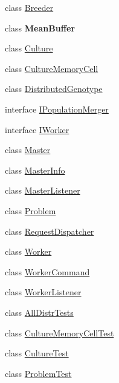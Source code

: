\begin{DoxyCompactItemize}
\item 
class \hyperlink{classorg_1_1jgap_1_1distr_1_1_breeder}{Breeder}
\item 
class {\bfseries Mean\-Buffer}
\item 
class \hyperlink{classorg_1_1jgap_1_1distr_1_1_culture}{Culture}
\item 
class \hyperlink{classorg_1_1jgap_1_1distr_1_1_culture_memory_cell}{Culture\-Memory\-Cell}
\item 
class \hyperlink{classorg_1_1jgap_1_1distr_1_1_distributed_genotype}{Distributed\-Genotype}
\item 
interface \hyperlink{interfaceorg_1_1jgap_1_1distr_1_1_i_population_merger}{I\-Population\-Merger}
\item 
interface \hyperlink{interfaceorg_1_1jgap_1_1distr_1_1_i_worker}{I\-Worker}
\item 
class \hyperlink{classorg_1_1jgap_1_1distr_1_1_master}{Master}
\item 
class \hyperlink{classorg_1_1jgap_1_1distr_1_1_master_info}{Master\-Info}
\item 
class \hyperlink{classorg_1_1jgap_1_1distr_1_1_master_listener}{Master\-Listener}
\item 
class \hyperlink{classorg_1_1jgap_1_1distr_1_1_problem}{Problem}
\item 
class \hyperlink{classorg_1_1jgap_1_1distr_1_1_request_dispatcher}{Request\-Dispatcher}
\item 
class \hyperlink{classorg_1_1jgap_1_1distr_1_1_worker}{Worker}
\item 
class \hyperlink{classorg_1_1jgap_1_1distr_1_1_worker_command}{Worker\-Command}
\item 
class \hyperlink{classorg_1_1jgap_1_1distr_1_1_worker_listener}{Worker\-Listener}
\item 
class \hyperlink{classorg_1_1jgap_1_1distr_1_1_all_distr_tests}{All\-Distr\-Tests}
\item 
class \hyperlink{classorg_1_1jgap_1_1distr_1_1_culture_memory_cell_test}{Culture\-Memory\-Cell\-Test}
\item 
class \hyperlink{classorg_1_1jgap_1_1distr_1_1_culture_test}{Culture\-Test}
\item 
class \hyperlink{classorg_1_1jgap_1_1distr_1_1_problem_test}{Problem\-Test}
\end{DoxyCompactItemize}
